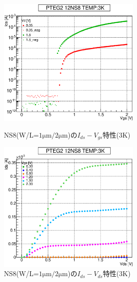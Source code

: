 				\begin{figure}[htbp]
					\begin{minipage}{0.5\hsize}
						\begin{center}
							\includegraphics[width=70mm]{./Chapter/Appendix/Picture/NST/NS8/PTEG2_12_NS8_IdVg_3K.eps}
						\end{center}
						\caption{NS8(W/L=$1\mathrm{\mu m}/2\mathrm{\mu m}$)の$I_{ds}-V_{gs}$特性(3K)}
						\label{fig:NS8_IdVg_3K}
					\end{minipage}
					\begin{minipage}{0.5\hsize}
						\begin{center}
							\includegraphics[width=70mm]{./Chapter/Appendix/Picture/NST/NS8/PTEG2_12_NS8_IdVd_3K.eps}
						\end{center}
						\caption{NS8(W/L=$1\mathrm{\mu m}/2\mathrm{\mu m}$)の$I_{ds}-V_{ds}$特性(3K)}
						\label{fig:NS8_IdVd_3K}
					\end{minipage}
				\end{figure}
				\clearpage
		
